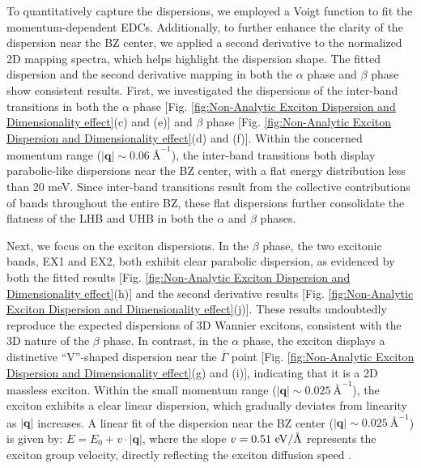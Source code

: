\documentclass[twocolumn,prl,showpacs,superscriptaddress,longbibliography]{revtex4-2}
\makeatletter
\newcommand{\lyxmathsym}[1]{\ifmmode\begingroup\def\b@ld{bold}
  \text{\ifx\math@version\b@ld\bfseries\fi#1}\endgroup\else#1\fi}
\makeatother
\begin{document}
To quantitatively capture the dispersions, we employed a Voigt function
to fit the momentum-dependent EDCs. Additionally, to further enhance
the clarity of the dispersion near the BZ center, we applied a second
derivative to the normalized 2D mapping spectra, which helps highlight
the dispersion shape. The fitted dispersion and the second derivative
mapping in both the $\alpha$ phase and $\beta$ phase show consistent
results. First, we investigated the dispersions of the inter-band
transitions in both the $\alpha$ phase {[}Fig. \ref{fig:Non-Analytic Exciton Dispersion and Dimensionality effect}(c)
and (e){]} and $\beta$ phase {[}Fig. \ref{fig:Non-Analytic Exciton Dispersion and Dimensionality effect}(d)
and (f){]}. Within the concerned momentum range ($|\boldsymbol{q}|\sim0.06\ \text{\AA}^{-1}$),
the inter-band transitions both display parabolic-like dispersions
near the BZ center, with a flat energy distribution less than 20 meV.
Since inter-band transitions result from the collective contributions
of bands throughout the entire BZ, these flat dispersions further
consolidate the flatness of the LHB and UHB in both the $\alpha$
and $\beta$ phases.

Next, we focus on the exciton dispersions. In the $\beta$ phase,
the two excitonic bands, EX1 and EX2, both exhibit clear parabolic
dispersion, as evidenced by both the fitted results {[}Fig. \ref{fig:Non-Analytic Exciton Dispersion and Dimensionality effect}(h){]}
and the second derivative results {[}Fig. \ref{fig:Non-Analytic Exciton Dispersion and Dimensionality effect}(j){]}.
These results undoubtedly reproduce the expected dispersions of 3D
Wannier excitons, consistent with the 3D nature of the $\beta$ phase.
In contrast, in the $\alpha$ phase, the exciton displays a distinctive
``V''-shaped dispersion near the $\overline{\Gamma}$ point {[}Fig.
\ref{fig:Non-Analytic Exciton Dispersion and Dimensionality effect}(g)
and (i){]}, indicating that it is a 2D massless exciton. Within the
small momentum range ($|\boldsymbol{q}|\sim0.025\ \text{\AA}^{-1}$),
the exciton exhibits a clear linear dispersion, which gradually deviates
from linearity as $|\boldsymbol{q}|$ increases. A linear fit of the
dispersion near the BZ center ($|\boldsymbol{q}|\sim0.025\ \text{\AA}^{-1}$)
is given by: $E=E_{0}+v\cdot|\boldsymbol{q}|$, where the slope $v=0.51\ {\rm eV}/\lyxmathsym{\AA}$
represents the exciton group velocity, directly reflecting the exciton
diffusion speed \citep{RN221,RN595}.
\end{document}
